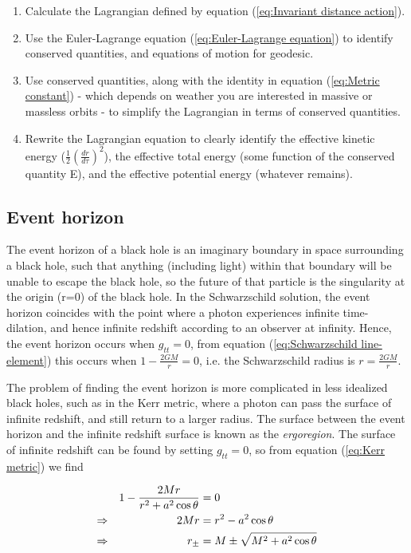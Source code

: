 \documentclass{article}
\begin{document}
\begin{enumerate}
    \item Calculate the Lagrangian defined by equation (\ref{eq:Invariant distance action}).
    \item Use the Euler-Lagrange equation (\ref{eq:Euler-Lagrange equation}) to identify conserved quantities, and equations of motion for geodesic.
    \item Use conserved quantities, along with the identity in equation (\ref{eq:Metric constant}) - which depends on weather you are interested in massive or massless orbits - to simplify the Lagrangian in terms of conserved quantities.
    \item Rewrite the Lagrangian equation to clearly identify the effective kinetic energy ($\frac{1}{2} \left( \frac{dr}{d\tau} \right)^2$), the effective total energy (some function of the conserved quantity E), and the effective potential energy (whatever remains).
\end{enumerate}  

\subsection{Event horizon}\label{sec:Event horizons}

The event horizon of a black hole is an imaginary boundary in space surrounding a black hole, such that anything (including light) within that boundary will be unable to escape the black hole, so the future of that particle is the singularity at the origin (r=0) of the black hole. In the Schwarzschild solution, the event horizon coincides with the point where a photon experiences infinite time-dilation, and hence infinite redshift according to an observer at infinity. Hence, the event horizon occurs when $g_{tt}=0$, from equation (\ref{eq:Schwarzschild line-element}) this occurs when $1-\frac{2GM}{r}=0$, i.e. the Schwarzschild radius is $r=\frac{2GM}{r}$.

The problem of finding the event horizon is more complicated in less idealized black holes, such as in the Kerr metric, where a photon can pass the surface of infinite redshift, and still return to a larger radius. The surface between the event horizon and the infinite redshift surface is known as the \textit{ergoregion}. The surface of infinite redshift can be found by setting $g_{tt}=0$, so from equation (\ref{eq:Kerr metric}) we find 

\begin{alignat}{2}
    &&1-\frac{2 M r}{r^2+a^2 \cos{\theta}} &= 0 \notag \\
    \Rightarrow
    && 2 M r &= r^2 - a^2 \cos{\theta} \notag \\
    \Rightarrow
    &&r_{\pm} &= M \pm \sqrt{M^2+a^2 \cos{\theta}}\label{eq:Kerr infinite redshift radius}
\end{alignat}
\end{document}
